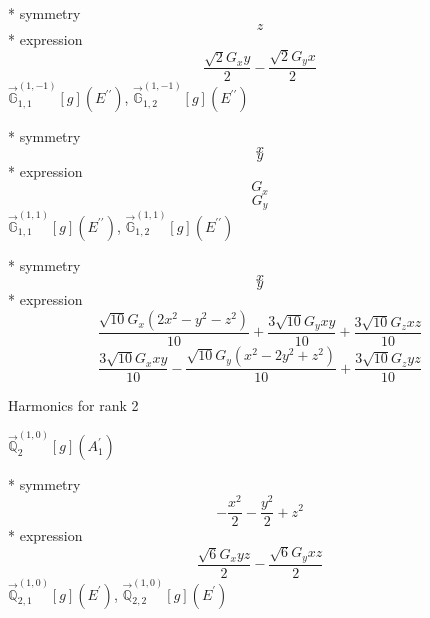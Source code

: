 \documentclass[fleqn,8pt]{jsarticle}
\begin{document}
\noindent\quad ** symmetry
\begin{dmath*}
z
\end{dmath*}
\noindent\quad ** expression
\begin{dmath*}
\frac{\sqrt{2} G_{x} y}{2} - \frac{\sqrt{2} G_{y} x}{2}
\end{dmath*}
\noindent\quad $\vec{\mathbb{G}}_{1,1}^{(1,-1)}[g](E^{\prime\prime})$, $\vec{\mathbb{G}}_{1,2}^{(1,-1)}[g](E^{\prime\prime})$

\noindent\quad ** symmetry
\begin{dmath*}
x
\end{dmath*}
\begin{dmath*}
y
\end{dmath*}
\noindent\quad ** expression
\begin{dmath*}
G_{x}
\end{dmath*}
\begin{dmath*}
G_{y}
\end{dmath*}
\noindent\quad $\vec{\mathbb{G}}_{1,1}^{(1,1)}[g](E^{\prime\prime})$, $\vec{\mathbb{G}}_{1,2}^{(1,1)}[g](E^{\prime\prime})$

\noindent\quad ** symmetry
\begin{dmath*}
x
\end{dmath*}
\begin{dmath*}
y
\end{dmath*}
\noindent\quad ** expression
\begin{dmath*}
\frac{\sqrt{10} G_{x} \left(2 x^{2} - y^{2} - z^{2}\right)}{10} + \frac{3 \sqrt{10} G_{y} x y}{10} + \frac{3 \sqrt{10} G_{z} x z}{10}
\end{dmath*}
\begin{dmath*}
\frac{3 \sqrt{10} G_{x} x y}{10} - \frac{\sqrt{10} G_{y} \left(x^{2} - 2 y^{2} + z^{2}\right)}{10} + \frac{3 \sqrt{10} G_{z} y z}{10}
\end{dmath*}

\noindent * Harmonics for rank 2

\noindent\quad $\vec{\mathbb{Q}}_{2}^{(1,0)}[g](A_{1}^{\prime})$

\noindent\quad ** symmetry
\begin{dmath*}
- \frac{x^{2}}{2} - \frac{y^{2}}{2} + z^{2}
\end{dmath*}
\noindent\quad ** expression
\begin{dmath*}
\frac{\sqrt{6} G_{x} y z}{2} - \frac{\sqrt{6} G_{y} x z}{2}
\end{dmath*}
\noindent\quad $\vec{\mathbb{Q}}_{2,1}^{(1,0)}[g](E^{\prime})$, $\vec{\mathbb{Q}}_{2,2}^{(1,0)}[g](E^{\prime})$
\end{document}
